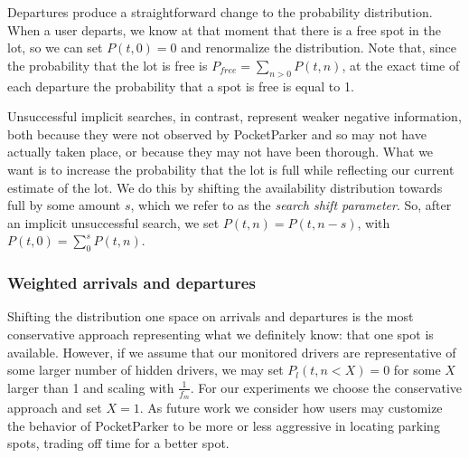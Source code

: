 Departures produce a straightforward change to the probability distribution.
When a user departs, we know at that moment that there is a free spot in the
lot, so we can set $P(t, 0) = 0$ and renormalize the distribution. Note that,
since the probability that the lot is free is $P_{free} = \sum_{n > 0} P(t,
n)$, at the exact time of each departure the probability that a spot is free
is equal to 1. 

Unsuccessful implicit searches, in contrast, represent weaker negative
information, both because they were not observed by PocketParker and so may
not have actually taken place, or because they may not have been thorough.
What we want is to increase the probability that the lot is full while
reflecting our current estimate of the lot. We do this by shifting the
availability distribution towards full by some amount $s$, which we refer to
as the \textit{search shift parameter}. So, after an implicit unsuccessful
search, we set $P(t, n) = P(t, n - s)$, with $P(t, 0) = \sum_0^s P(t, n)$.

\subsubsection{Weighted arrivals and departures}

Shifting the distribution one space on arrivals and departures is the most
conservative approach representing what we definitely know: that one spot is
available. However, if we assume that our monitored drivers are
representative of some larger number of hidden drivers, we may set $P_l(t, n
< X) = 0$ for some $X$ larger than 1 and scaling with $\frac{1}{f_m}$. For
our experiments we choose the conservative approach and set $X = 1$. As
future work we consider how users may customize the behavior of PocketParker
to be more or less aggressive in locating parking spots, trading off time for
a better spot.
